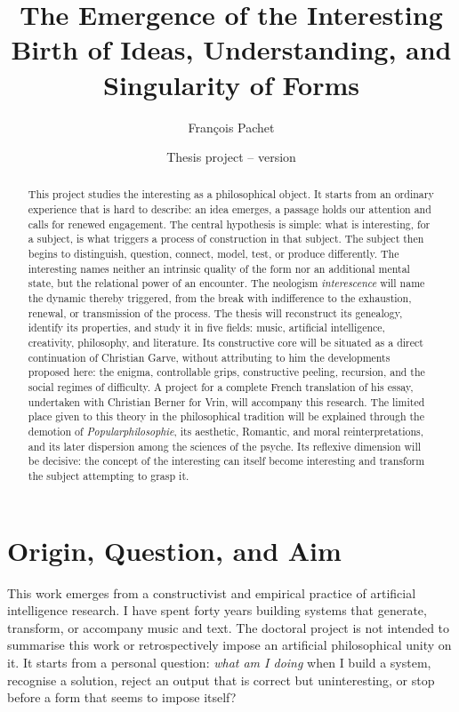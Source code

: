 \documentclass[11pt,a4paper]{article}
\title{The Emergence of the Interesting\\
\large Birth of Ideas, Understanding, and Singularity of Forms}
\author{François Pachet}
\date{Thesis project -- version \projectversion\\\small \projectdate}
\begin{document}
\maketitle

\begin{abstract}
This project studies the interesting as a philosophical object. It
starts from an ordinary experience that is hard to describe: an idea emerges,
a passage holds our attention and calls for renewed engagement. The central
hypothesis is simple: what is interesting, for a subject, is what triggers a
process of construction in that subject. The subject then begins to
distinguish, question, connect, model, test, or produce differently. The
interesting names neither an intrinsic quality of the form nor an additional
mental state, but the relational power of an encounter. The neologism
\emph{interescence} will name the dynamic thereby triggered, from the break with
indifference to the exhaustion, renewal, or transmission of the process. The
thesis will reconstruct its genealogy, identify its properties, and study it
in five fields: music, artificial intelligence, creativity, philosophy, and
literature. Its constructive core will be situated as a direct continuation of
Christian Garve, without attributing to him the developments proposed here: the
enigma, controllable grips, constructive peeling, recursion, and the social
regimes of difficulty. A project for a complete French translation of
his essay, undertaken with Christian Berner for Vrin, will accompany this
research. The limited place given to this theory in the philosophical tradition
will be explained through the demotion of \emph{Popularphilosophie}, its
aesthetic, Romantic, and moral reinterpretations, and its later dispersion
among the sciences of the psyche.
Its reflexive dimension will be decisive: the concept of the interesting can
itself become interesting and transform the subject attempting to grasp it.
\end{abstract}

\section{Origin, Question, and Aim}

This work emerges from a constructivist and empirical practice of artificial
intelligence research. I have spent forty years building systems that generate,
transform, or accompany music and text. The doctoral project is not intended to
summarise this work or retrospectively impose an artificial philosophical unity
on it. It starts from a personal question: \emph{what am I doing} when I
build a system, recognise a solution, reject an output that is correct but
uninteresting, or stop before a form that seems to impose itself?
\end{document}
